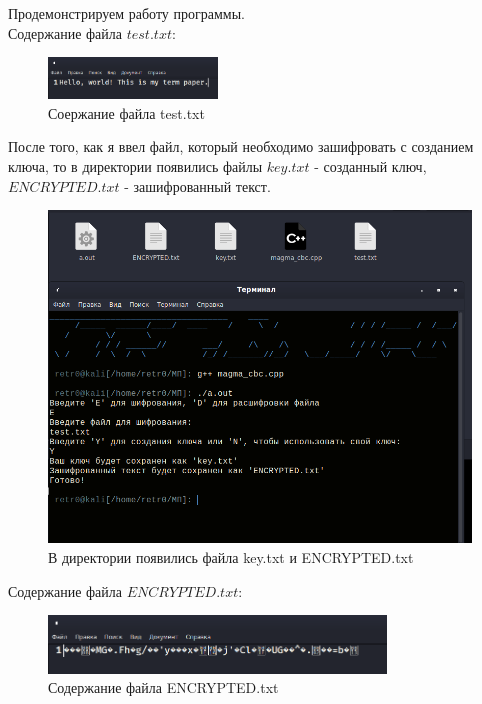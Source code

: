 \documentclass[oneside,final,14pt]{extreport}
\begin{document}
Продемонстрируем работу программы.\\
Содержание файла $test.txt:$\\

\begin{figure}[h!]
\includegraphics[width=0.4\textwidth]{19.png}
\caption{Соержание файла test.txt}
\end{figure}


После того, как я ввел файл, который необходимо зашифровать с созданием ключа, то в директории появились файлы $key.txt$ - созданный ключ, $ENCRYPTED.txt$ - зашифрованный текст.

\begin{figure}[h!]
\includegraphics[width=1\textwidth]{20.png}
\caption{В директории появились файла key.txt и ENCRYPTED.txt }

\end{figure}


Содержание файла $ENCRYPTED.txt$:\\

\begin{figure}[h!]
\includegraphics[width=0.8\textwidth]{21.png}
\caption{Содержание файла ENCRYPTED.txt }
\end{figure}
\end{document}
